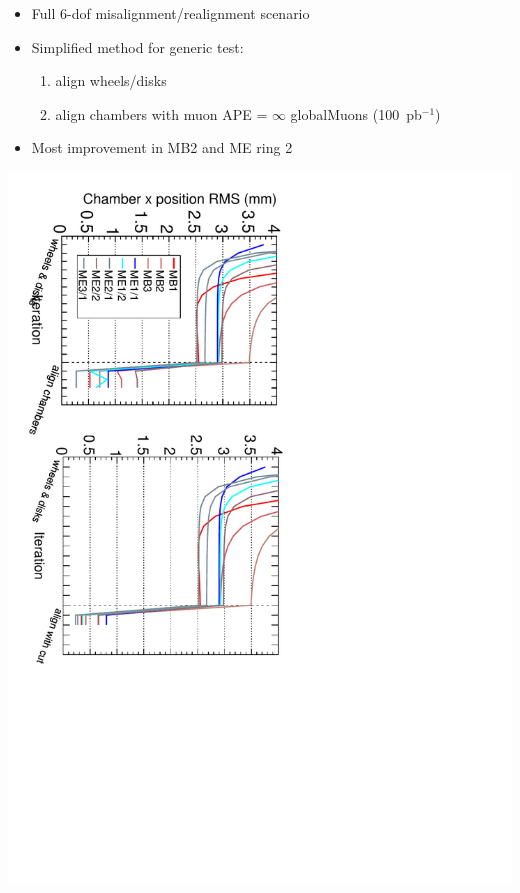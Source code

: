 \documentclass[compress]{beamer}
\begin{document}
\begin{frame}
\begin{itemize}
\item Full 6-dof misalignment/realignment scenario
\item Simplified method for generic test:
\begin{enumerate}
\item align wheels/disks
\item align chambers with muon APE = $\infty$ globalMuons (100~pb$^{-1}$)
\end{enumerate}
\item Most improvement in MB2 and ME ring 2
\end{itemize}

\includegraphics[height=\linewidth, angle=90]{compate_with_without_cut.pdf}
\end{frame}

\end{document}
